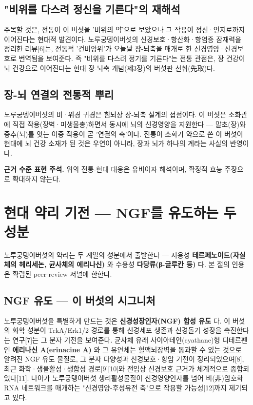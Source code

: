 \documentclass[11pt,oneside]{book}
\newenvironment{authnote}
  {\par\smallskip\begingroup\leftskip=7mm\rightskip=5mm\small\color{muted}\noindent\ignorespaces}
  {\par\endgroup\smallskip}
\begin{document}
\subsection{"비위를 다스려 정신을 기른다"의 재해석}
주목할 것은, 전통이 이 버섯을 '비위의 약'으로 보았으나 그 작용이 정신·인지로까지 이어진다는 현대적 발견이다. 노루궁뎅이버섯의 신경보호·항산화·항염증 잠재력을 정리한 리뷰[6]는, 전통적 '건비양위'가 오늘날 장-뇌축을 매개로 한 신경영양·신경보호로 번역됨을 보여준다. 즉 "비위를 다스려 정기를 기른다"는 전통 관점은, 장 건강이 뇌 건강으로 이어진다는 현대 장-뇌축 개념(제3장)의 버섯판 선취(先取)다.

\subsection{장-뇌 연결의 전통적 뿌리}
노루궁뎅이버섯의 비·위경 귀경은 힘뇌장 장-뇌축 설계의 접점이다. 이 버섯은 소화관에 직접 작용(장벽·미생물총)하면서 동시에 뇌의 신경영양을 지원한다 — 말초(장)와 중추(뇌)를 잇는 이중 작용이 곧 '연결의 축'이다. 전통이 소화기 약으로 쓴 이 버섯이 현대에 뇌 건강 소재가 된 것은 우연이 아니라, 장과 뇌가 하나의 계라는 사실의 반영이다.

\begin{authnote}\textbf{근거 수준 표현 주석.} 위의 전통-현대 대응은 유비이자 해석이며, 확정적 효능 주장으로 확대하지 않는다.\end{authnote}
\section{현대 약리 기전 — NGF를 유도하는 두 성분}
노루궁뎅이버섯의 약리는 두 계열의 성분에서 출발한다 — 지용성 \textbf{테르페노이드(자실체의 헤리세논, 균사체의 에리나신)} 와 수용성 \textbf{다당류(β-글루칸 등)} 다. 본 절의 인용은 확립된 peer-review 저널에 한한다.

\subsection{NGF 유도 — 이 버섯의 시그니처}
노루궁뎅이버섯을 특별하게 만드는 것은 \textbf{신경성장인자(NGF) 합성 유도} 다. 이 버섯의 화학 성분이 TrkA/Erk1/2 경로를 통해 신경세포 생존과 신경돌기 성장을 촉진한다는 연구[7]는 그 분자 기전을 보여준다. 균사체 유래 사이아테인(cyathane)형 디테르펜인 \textbf{에리나신 A(erinacine A)} 와 그 유연체는 혈액뇌장벽을 통과할 수 있는 것으로 알려진 NGF 유도 물질로, 그 분자 다양성과 신경보호·항암 기전이 정리되었으며[8], 최근 화학·생물활성·생합성 경로[9][10]와 전임상 신경보호 근거가 체계적으로 종합되었다[11]. 나아가 노루궁뎅이버섯 생리활성물질이 신경영양인자를 넘어 비(非)암호화 RNA 네트워크를 매개하는 "신경영양-후성유전 축"으로 작용할 가능성[12]까지 제기되고 있다.
\end{document}
